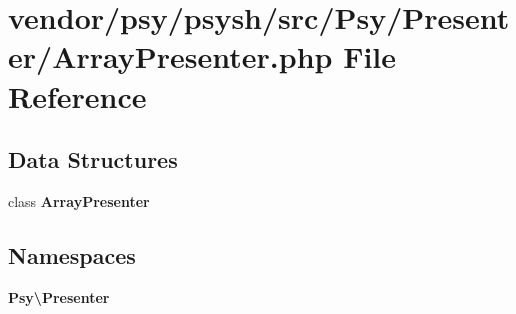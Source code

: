 \section{vendor/psy/psysh/src/\+Psy/\+Presenter/\+Array\+Presenter.php File Reference}
\label{_array_presenter_8php}
\subsection*{Data Structures}
\begin{DoxyCompactItemize}
\item 
class {\bf Array\+Presenter}
\end{DoxyCompactItemize}
\subsection*{Namespaces}
\begin{DoxyCompactItemize}
\item 
 {\bf Psy\textbackslash{}\+Presenter}
\end{DoxyCompactItemize}
